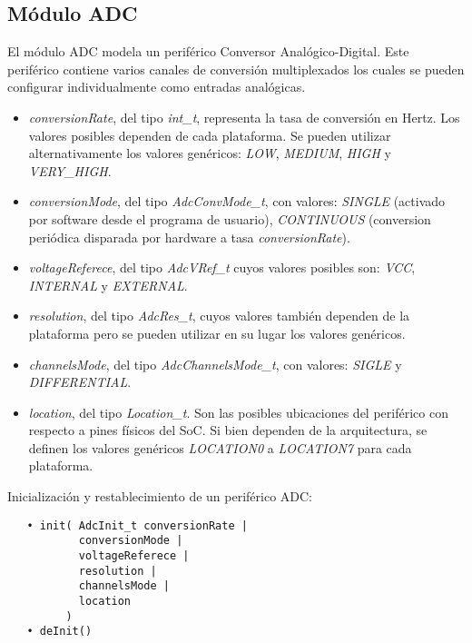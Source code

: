 \subsection{Módulo ADC}

El módulo ADC modela un periférico Conversor Analógico-Digital. Este periférico contiene varios canales de conversión multiplexados los cuales se pueden configurar individualmente como entradas analógicas.


\begin{itemize}
\item
\emph{conversionRate}, del tipo \emph{int\_t}, representa la tasa de conversión en Hertz. Los valores posibles dependen de cada plataforma. Se pueden utilizar alternativamente los valores genéricos: \emph{LOW}, \emph{MEDIUM}, \emph{HIGH} y \emph{VERY\_HIGH}.
\item
\emph{conversionMode}, del tipo \emph{AdcConvMode\_t}, con valores: \emph{SINGLE} (activado por software desde el programa de usuario), \emph{CONTINUOUS} (conversion periódica disparada por hardware a tasa \emph{conversionRate}).%
\item
\emph{voltageReferece}, del tipo \emph{AdcVRef\_t} cuyos valores posibles son: \emph{VCC}, \emph{INTERNAL} y \emph{EXTERNAL}.
\item
\emph{resolution}, del tipo \emph{AdcRes\_t}, cuyos valores también dependen de la plataforma pero se pueden utilizar en su lugar los valores genéricos.
\item
\emph{channelsMode}, del tipo \emph{AdcChannelsMode\_t}, con valores: \emph{SIGLE} y \emph{DIFFERENTIAL}.
\item
\emph{location}, del tipo \emph{Location\_t}. Son las posibles ubicaciones del periférico con respecto a pines físicos del SoC. Si bien dependen de la arquitectura, se definen los valores genéricos \emph{LOCATION0} a \emph{LOCATION7} para cada plataforma.
\end{itemize}


Inicialización y restablecimiento de un periférico ADC:

\begin{verbatim}
   • init( AdcInit_t conversionRate | 
           conversionMode |
           voltageReferece |
           resolution |
           channelsMode |
           location
         )
   • deInit()
\end{verbatim}

